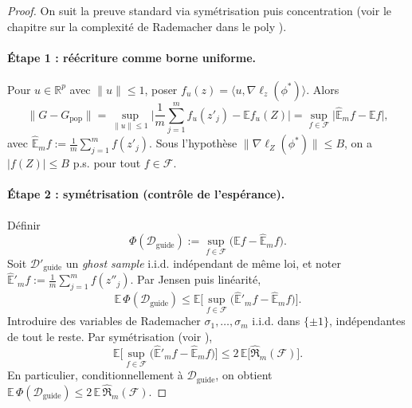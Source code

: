 \documentclass[11pt]{article}
\begin{document}
\begin{proof}
On suit la preuve standard via symétrisation puis concentration (voir le chapitre sur la complexité de Rademacher dans le poly \cite{biau_poly}).

\paragraph{Étape 1 : réécriture comme borne uniforme.}
Pour $u\in\mathbb R^p$ avec $\|u\|\le 1$, poser $f_u(z)=\langle u,\nabla \ell_z(\phi^*)\rangle$.
Alors
\[
\|G-G_{\text{pop}}\|
=
\sup_{\|u\|\le 1}\Big|\frac1m\sum_{j=1}^m f_u(z'_j)-\mathbb E f_u(Z)\Big|
=
\sup_{f\in\mathcal F}\Big|\widehat{\mathbb E}_m f-\mathbb E f\Big|,
\]
avec $\widehat{\mathbb E}_m f:=\frac1m\sum_{j=1}^m f(z'_j)$.
Sous l'hypothèse $\|\nabla \ell_Z(\phi^*)\|\le B$, on a $|f(Z)|\le B$ p.s. pour tout $f\in\mathcal F$.

\paragraph{Étape 2 : symétrisation (contrôle de l'espérance).}
Définir
\[
\Phi(\mathcal D_{\text{guide}}):=\sup_{f\in\mathcal F}\big(\mathbb E f-\widehat{\mathbb E}_m f\big).
\]
Soit $\mathcal D'_{\text{guide}}$ un \emph{ghost sample} i.i.d. indépendant de même loi, et noter
$\widehat{\mathbb E}'_m f:=\frac1m\sum_{j=1}^m f(z''_j)$.
Par Jensen puis linéarité,
\[
\mathbb E\,\Phi(\mathcal D_{\text{guide}})
\le
\mathbb E\Big[\sup_{f\in\mathcal F}\big(\widehat{\mathbb E}'_m f-\widehat{\mathbb E}_m f\big)\Big].
\]
Introduire des variables de Rademacher $\sigma_1,\dots,\sigma_m$ i.i.d. dans $\{\pm1\}$, indépendantes de tout le reste.
Par symétrisation (voir \cite{biau_poly}),
\[
\mathbb E\Big[\sup_{f\in\mathcal F}\big(\widehat{\mathbb E}'_m f-\widehat{\mathbb E}_m f\big)\Big]
\le
2\,\mathbb E\big[\widehat{\mathfrak R}_m(\mathcal F)\big].
\]
En particulier, conditionnellement à $\mathcal D_{\text{guide}}$, on obtient
$\mathbb E\,\Phi(\mathcal D_{\text{guide}})\le 2\,\mathbb E\,\widehat{\mathfrak R}_m(\mathcal F)$.


\end{proof}
\end{document}
